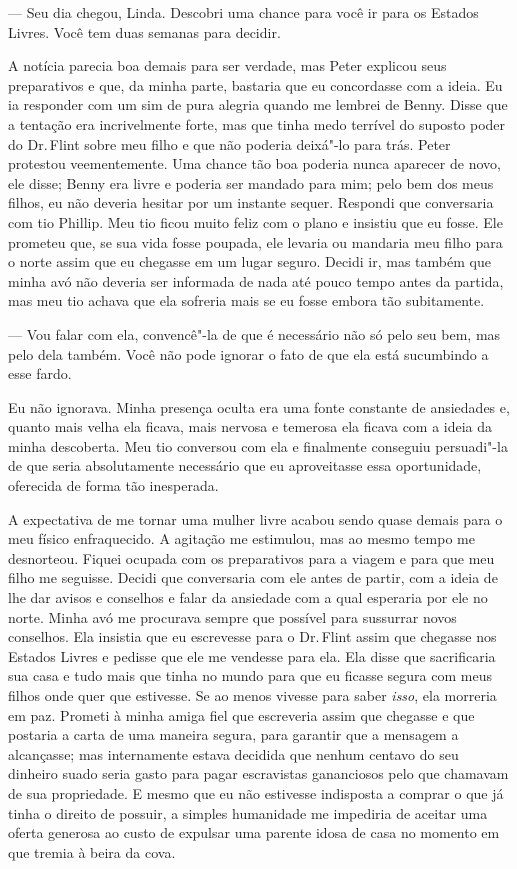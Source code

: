 --- Seu dia chegou, Linda. Descobri uma chance para você ir para os
Estados Livres. Você tem duas semanas para decidir.

A notícia parecia boa demais para ser verdade, mas Peter explicou seus
preparativos e que, da minha parte, bastaria que eu concordasse com a
ideia. Eu ia responder com um sim de pura alegria quando me lembrei de
Benny. Disse que a tentação era incrivelmente forte, mas que tinha medo
terrível do suposto poder do Dr.\,Flint sobre meu filho e que não poderia
deixá"-lo para trás. Peter protestou veementemente. Uma chance tão boa
poderia nunca aparecer de novo, ele disse; Benny era livre e poderia ser
mandado para mim; pelo bem dos meus filhos, eu não deveria hesitar por
um instante sequer. Respondi que conversaria com tio Phillip. Meu tio
ficou muito feliz com o plano e insistiu que eu fosse. Ele prometeu que,
se sua vida fosse poupada, ele levaria ou mandaria meu filho para o
norte assim que eu chegasse em um lugar seguro. Decidi ir, mas também
que minha avó não deveria ser informada de nada até pouco tempo antes da
partida, mas meu tio achava que ela sofreria mais se eu fosse embora tão
subitamente.

--- Vou falar com ela, convencê"-la de que é necessário não só pelo seu
bem, mas pelo dela também. Você não pode ignorar o fato de que ela está
sucumbindo a esse fardo.

Eu não ignorava. Minha presença oculta era uma fonte constante de
ansiedades e, quanto mais velha ela ficava, mais nervosa e temerosa ela
ficava com a ideia da minha descoberta. Meu tio conversou com ela e
finalmente conseguiu persuadi"-la de que seria absolutamente necessário
que eu aproveitasse essa oportunidade, oferecida de forma tão
inesperada.

A expectativa de me tornar uma mulher
livre acabou sendo quase demais para o meu físico enfraquecido. A
agitação me estimulou, mas ao mesmo tempo me desnorteou. Fiquei ocupada
com os preparativos para a viagem e para que meu filho me seguisse.
Decidi que conversaria com ele antes de partir, com a ideia de lhe dar
avisos e conselhos e falar da ansiedade com a qual esperaria por ele no
norte. Minha avó me procurava sempre que possível para sussurrar novos
conselhos. Ela insistia que eu escrevesse para o Dr.\,Flint assim que
chegasse nos Estados Livres e pedisse que ele me vendesse para ela. Ela
disse que sacrificaria sua casa e tudo mais que tinha no mundo para que
eu ficasse segura com meus filhos onde quer que estivesse. Se ao menos
vivesse para saber \emph{isso}, ela morreria em paz. Prometi à minha
amiga fiel que escreveria assim que chegasse e que postaria a carta de
uma maneira segura, para garantir que a mensagem a alcançasse; mas
internamente estava decidida que nenhum centavo do seu dinheiro suado
seria gasto para pagar escravistas gananciosos pelo que chamavam de sua
propriedade. E mesmo que eu não estivesse indisposta a comprar o que já
tinha o direito de possuir, a simples humanidade me impediria de aceitar
uma oferta generosa ao custo de expulsar uma parente idosa de casa no
momento em que tremia à beira da cova.

